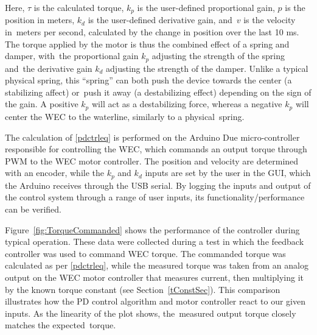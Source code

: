 \documentclass[hardware,article,submit,pdftex,moreauthors]{Definitions/mdpi}
\begin{document}
Here, $\tau$ is the calculated torque, $k_p$ is the user-defined proportional gain, $p$ is the position in meters, $k_d$ is the user-defined derivative gain, and~$v$ is the velocity in~meters per second, calculated by the change in position over the last 10 ms.
The torque applied by the motor is thus the combined effect of a spring and damper, with~the proportional gain $k_p$ adjusting the strength of the spring and~the derivative gain $k_d$ adjusting the strength of the damper.
Unlike a typical physical spring, this ``spring'' can both push the device towards the center (a stabilizing affect) or~push it away (a destabilizing effect) depending on the sign of the gain.
A positive $k_p$ will act as a destabilizing force, whereas a negative $k_p$ will center the WEC to the waterline, similarly to a physical~spring.

The calculation of \eqref{pdctrleq} is performed on the Arduino Due micro-controller responsible for controlling the WEC, which commands an output torque through PWM to the WEC motor controller.
The position and velocity are determined with an encoder, while the $k_p$ and $k_d$ inputs are set by the user in the GUI, which the Arduino receives through the USB serial.
By logging the inputs and output of the control system through a range of user inputs, its functionality/performance can be verified.

Figure~\ref{fig:TorqueCommanded} shows the performance of the controller during typical operation.
These data were collected during a test in which the feedback controller was used to command WEC torque.
The commanded torque was calculated as per \eqref{pdctrleq}, while the measured torque was taken from an analog output on the WEC motor controller that measures current, then multiplying it by the known torque constant (see Section~\ref{tConstSec}).
This comparison illustrates how the PD control algorithm and motor controller react to our given inputs.
As the linearity of the plot shows, the~measured output torque closely matches the expected~torque.
\end{document}
